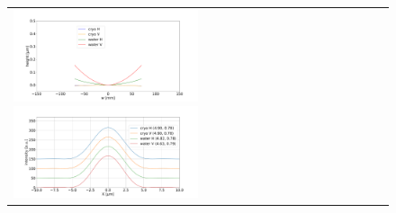\documentclass[aps,pra,showpacs,twocolumn,amsmath,amssymb,superscriptaddress,nofootinbib]{revtex4}
\begin{document}
\begin{figure}
\begin{center}
\begin{tabular}{l}
   \includegraphics[width=0.5\textwidth]{figures/correctionprofilescropped.pdf}
   \includegraphics[width=0.5\textwidth]{figures/intensitycorrectedcropped.pdf}\\
   \end{tabular}
   \end{center}

   \end{figure} 
\end{document}

